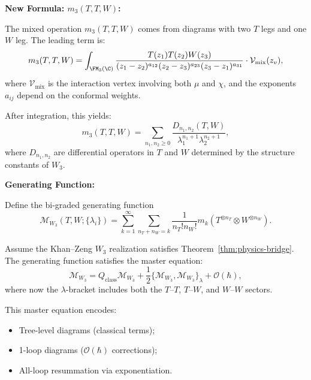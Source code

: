 \textbf{New Formula: $m_3(T,T,W)$:}

The mixed operation $m_3(T,T,W)$ comes from diagrams with two $T$ legs and one $W$ leg. The leading term is:
\begin{equation}
m_3(T,T,W) = \int_{\FM_3(\C)} \frac{T(z_1) T(z_2) W(z_3)}{(z_1-z_2)^{a_{12}} (z_2-z_3)^{a_{23}} (z_3-z_1)^{a_{31}}} \cdot \mathcal{V}_{\text{mix}}(z_v),
\end{equation}
where $\mathcal{V}_{\text{mix}}$ is the interaction vertex involving both $\mu$ and $\chi$, and the exponents $a_{ij}$ depend on the conformal weights.

After integration, this yields:
\begin{equation}
m_3(T,T,W) = \sum_{n_1, n_2 \geq 0} \frac{D_{n_1,n_2}(T,W)}{\lambda_1^{n_1+1} \lambda_2^{n_2+1}},
\end{equation}
where $D_{n_1,n_2}$ are differential operators in $T$ and $W$ determined by the structure constants of $W_3$.

\textbf{Generating Function:}

Define the bi-graded generating function
\begin{equation}
\mathcal{M}_{W_3}(T,W; \{\lambda_i\}) = \sum_{k=1}^\infty \sum_{n_T + n_W = k} \frac{1}{n_T! n_W!} m_k(T^{\otimes n_T} \otimes W^{\otimes n_W}).
\end{equation}

\begin{theorem}
Assume the Khan--Zeng $W_3$ realization satisfies
Theorem~\ref{thm:physics-bridge}.
The generating function satisfies the master equation:
\begin{equation}
\mathcal{M}_{W_3} = Q_{\text{class}} \mathcal{M}_{W_3} + \frac{1}{2} \{\mathcal{M}_{W_3}, \mathcal{M}_{W_3}\}_{\lambda} + \mathcal{O}(\hbar),
\end{equation}
where now the $\lambda$-bracket includes both the $T$--$T$, $T$--$W$, and $W$--$W$ sectors.
\end{theorem}

This master equation encodes:
\begin{itemize}
\item Tree-level diagrams (classical terms);
\item 1-loop diagrams ($\mathcal{O}(\hbar)$ corrections);
\item All-loop resummation via exponentiation.
\end{itemize}

